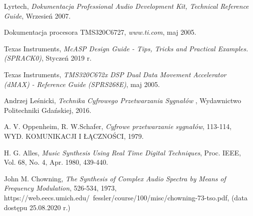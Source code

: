\documentclass[nostrict]{szablonPG}
\begin{document}
\begin{thebibliography}{20}
		Lyrtech, \emph{Dokumentacja Professional Audio Development Kit, Technical Reference Guide}, Wrzesień 2007.
		
		Dokumentacja procesora TMS320C6727, \emph{www.ti.com}, maj 2005.
		
	    Texas Instruments, \emph{McASP Design Guide - Tips, Tricks and Practical Examples. (SPRACK0)}, Styczeń 2019 r.
		
		Texas Instruments, \emph{TMS320C672x DSP Dual Data Movement Accelerator (dMAX) - Reference Guide (SPRS268E)}, maj 2005.
		
		Andrzej Le\'snicki, \emph{Technika Cyfrowego Przetwarzania Sygna\l{}\'ow }, Wydawnictwo Politechniki Gda\'nskiej, 2016.
		
		A. V. Oppenheim, R. W.Schafer, \emph{Cyfrowe przetwarzanie sygnałów}, 113-114, WYD. KOMUNIKACJI I ŁĄCZNOŚCI, 1979.
		
		 H. G. Alles, \emph{Music Synthesis Using Real Time Digital Techniques}, Proc. IEEE, Vol. 68, No. 4, Apr. 1980, 439-440.

		John M. Chowning, \emph{The Synthesis of Complex Audio Spectra by Means of Frequency Modulation}, 526-534, 1973, https://web.eecs.umich.edu/~fessler/course/100/misc/chowning-73-tso.pdf, (data dostępu 25.08.2020 r.)
			
	\end{thebibliography}
	
\end{document}
